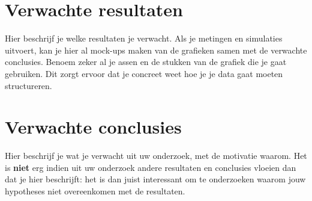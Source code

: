 \documentclass[fleqn,10pt]{voorstel}
\begin{document}
\section{Verwachte resultaten}
Hier beschrijf je welke resultaten je verwacht. Als je metingen en simulaties uitvoert, kan je hier al mock-ups maken van de grafieken samen met de verwachte conclusies. Benoem zeker al je assen en de stukken van de grafiek die je gaat gebruiken. Dit zorgt ervoor dat je concreet weet hoe je je data gaat moeten structureren.

\section{Verwachte conclusies}
Hier beschrijf je wat je verwacht uit uw onderzoek, met de motivatie waarom. Het is \textbf{niet} erg indien uit uw onderzoek andere resultaten en conclusies vloeien dan dat je hier beschrijft: het is dan juist interessant om te onderzoeken waarom jouw hypotheses niet overeenkomen met de resultaten.




\end{document}
